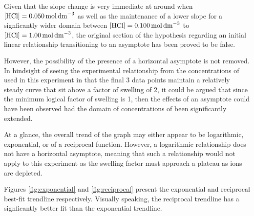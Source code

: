 \documentclass[11pt, letterpaper]{article}
\begin{document}
Given that the slope change is very immediate at around when \(\ce{[HCl]} = \SI{0.050}{mol.dm^{-3}}\)
as well as the maintenance of a lower slope for a signficantly wider domain
between \(\ce{[HCl]} = \SI{0.100}{mol.dm^{-3}}\) to \(\ce{[HCl]} = \SI{1.00}{mol.dm^{-3}}\),
the original section of the hypothesis regarding an initial linear relationship
transitioning to an asymptote has been proved to be false.

However, the possibility of the presence of a horizontal asymptote is not
removed. In hindsight of seeing the experimental relationship from the concentrations
of  used in this experiment in that the final 3 data points maintain
a relatively steady curve that sit above a factor of swelling of 2,
it could be argued that since the minimum logical factor of swelling is 1, then the effects of an asymptote could have been observed had
the domain of concentrations of  been significantly extended.

At a glance, the overall trend of the graph may either appear to be logarithmic,
exponential, or of a reciprocal function. However, a logarithmic relationship
does not have a horizontal asymptote, meaning that such a relationship would
not apply to this experiment as the swelling factor must approach a plateau
as  ions are depleted.

Figures \ref*{fig:exponential} and \ref*{fig:reciprocal} present the
exponential and reciprocal best-fit trendline respectively.
Visually speaking, the reciprocal trendline has a signficantly
better fit than the exponential trendline.
\end{document}
